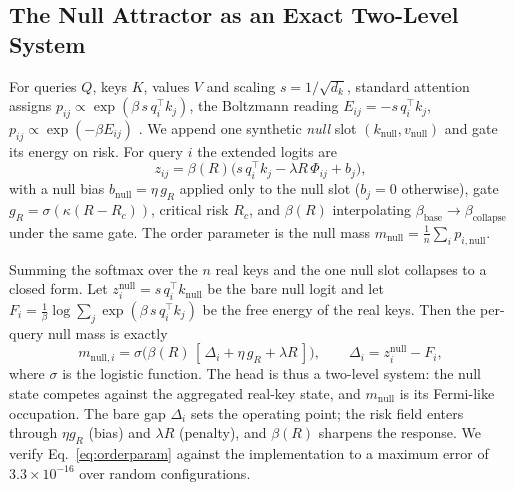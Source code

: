 \documentclass[letterpaper]{article} %
\begin{document}
\subsection{The Null Attractor as an Exact Two-Level System}
\label{sec:theory-order}
For queries $Q$, keys $K$, values $V$ and scaling $s=1/\sqrt{d_k}$, standard attention assigns
$p_{ij}\propto\exp(\beta\,s\,q_i^\top k_j)$, the Boltzmann reading $E_{ij}=-s\,q_i^\top k_j$,
$p_{ij}\propto\exp(-\beta E_{ij})$
\citep{ramsauer2020hopfield,hoover2023energytransformer,santos2024hopfieldfenchelyoung}. We append
one synthetic \emph{null} slot $(k_{\text{null}},v_{\text{null}})$ and gate its energy on risk. For
query $i$ the extended logits are
%
\begin{equation}
z_{ij} = \beta(R)\bigl(s\,q_i^\top k_j - \lambda R\,\Phi_{ij} + b_j\bigr),
\label{eq:logits}
\end{equation}
%
with a null bias $b_{\text{null}}=\eta\,g_R$ applied only to the null slot ($b_j=0$ otherwise),
gate $g_R=\sigma(\kappa(R-R_c))$, critical risk $R_c$, and $\beta(R)$ interpolating
$\beta_{\text{base}}\!\to\!\beta_{\text{collapse}}$ under the same gate. The order parameter is the
null mass $m_{\text{null}}=\frac1n\sum_i p_{i,\text{null}}$.

Summing the softmax over the $n$ real keys and the one null slot collapses to a closed form. Let
$z^{\text{null}}_i=s\,q_i^\top k_{\text{null}}$ be the bare null logit and let
$F_i=\frac1\beta\log\sum_{j}\exp(\beta\,s\,q_i^\top k_j)$ be the free energy of the real keys.
Then the per-query null mass is exactly
%
\begin{equation}
m_{\text{null},i} = \sigma\!\bigl(\beta(R)\,[\,\Delta_i + \eta\,g_R + \lambda R\,]\bigr),
\qquad \Delta_i = z^{\text{null}}_i - F_i,
\label{eq:orderparam}
\end{equation}
%
where $\sigma$ is the logistic function. The head is thus a two-level system: the null state
competes against the aggregated real-key state, and $m_{\text{null}}$ is its Fermi-like occupation.
The bare gap $\Delta_i$ sets the operating point; the risk field enters through $\eta g_R$ (bias)
and $\lambda R$ (penalty), and $\beta(R)$ sharpens the response. We verify Eq.~\eqref{eq:orderparam}
against the implementation to a maximum error of $3.3\times10^{-16}$ over random configurations.
\end{document}

